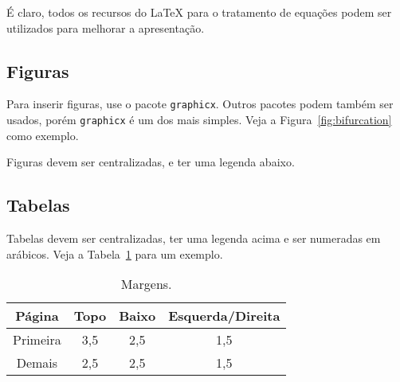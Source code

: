 \documentclass[a4paper]{ifacconf}
\begin{document}
É claro, todos os recursos do {\LaTeX} para o tratamento de equações podem
ser utilizados para melhorar a apresentação. 

\subsection{Figuras}

Para inserir figuras, use o pacote \texttt{graphicx}. Outros pacotes podem
também ser usados, porém  \texttt{graphicx} é um dos mais simples. Veja
a Figura~\ref{fig:bifurcation} como exemplo. 



Figuras devem ser centralizadas, e ter uma legenda abaixo. 

\subsection{Tabelas}

Tabelas devem ser centralizadas, ter uma legenda acima e ser numeradas em arábicos.
Veja a Tabela~\ref{tb:margins} para um exemplo. 


\begin{table}[hb]
\begin{center}
\caption{Margens.}\label{tb:margins}
\begin{tabular}{cccc}
Página & Topo & Baixo & Esquerda/Direita \\\hline
Primeira & 3,5 & 2,5 & 1,5 \\
Demais & 2,5 & 2,5 & 1,5 \\ \hline
\end{tabular}
\end{center}
\end{table}
\end{document}
